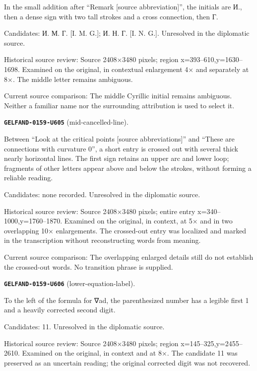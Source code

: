 In the small addition after “Remark [source abbreviation]”, the initials are И., then a dense sign with two tall strokes and a cross connection, then Г.\par
Candidates: И. М. Г. [I. M. G.]; И. Н. Г. [I. N. G.]. Unresolved in the diplomatic source.\par
Historical source review: Source 2408×3480 pixels; region x=393–610,y=1630–1698. Examined on the original, in contextual enlargement 4× and separately at 8×. The middle letter remains ambiguous.\par
Current source comparison: The middle Cyrillic initial remains ambiguous. Neither a familiar name nor the surrounding attribution is used to select it.\par\medskip
\par\noindent\leavevmode{}\label{GELFAND-0159-U605}\label{GELFAND-P001474:mid-cancelled-line}\textbf{\texttt{GELFAND-0159-U605}} (mid-cancelled-line).\nopagebreak[4]\par
Between “Look at the critical points [source abbreviations]” and “These are connections with curvature 0”, a short entry is crossed out with several thick nearly horizontal lines. The first sign retains an upper arc and lower loop; fragments of other letters appear above and below the strokes, without forming a reliable reading.\par
Candidates: none recorded. Unresolved in the diplomatic source.\par
Historical source review: Source 2408×3480 pixels; entire entry x=340–1000,y=1760–1870. Examined on the original, in context, at 5× and in two overlapping 10× enlargements. The crossed-out entry was localized and marked in the transcription without reconstructing words from meaning.\par
Current source comparison: The overlapping enlarged details still do not establish the crossed-out words. No transition phrase is supplied.\par\medskip
\par\noindent\leavevmode{}\label{GELFAND-0159-U606}\label{GELFAND-P001474:lower-equation-label}\textbf{\texttt{GELFAND-0159-U606}} (lower-equation-label).\nopagebreak[4]\par
To the left of the formula for ∇ad, the parenthesized number has a legible first 1 and a heavily corrected second digit.\par
Candidates: 11. Unresolved in the diplomatic source.\par
Historical source review: Source 2408×3480 pixels; region x=145–325,y=2455–2610. Examined on the original, in context and at 8×. The candidate 11 was preserved as an uncertain reading; the original corrected digit was not recovered.\par
